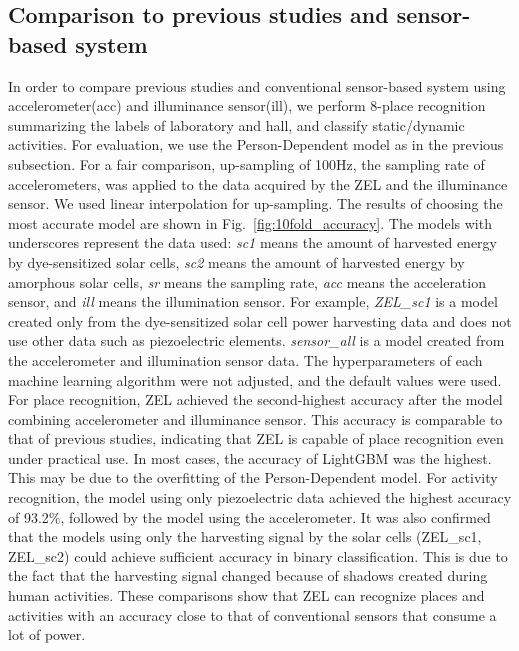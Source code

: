 \documentclass[conference]{IEEEtran}
\begin{document}
\subsection{Comparison to previous studies and sensor-based system}
In order to compare previous studies and conventional sensor-based system using accelerometer(acc) and illuminance sensor(ill), we perform 8-place recognition summarizing the labels of laboratory and hall, and classify static/dynamic activities.
For evaluation, we use the Person-Dependent model as in the previous subsection.
For a fair comparison, up-sampling of 100Hz, the sampling rate of accelerometers, was applied to the data acquired by the ZEL and the illuminance sensor.
We used linear interpolation for up-sampling.
The results of choosing the most accurate model are shown in Fig.~\ref{fig:10fold_accuracy}.
The models with underscores represent the data used: \textit{sc1} means the amount of harvested energy by dye-sensitized solar cells, \textit{sc2} means the amount of harvested energy by amorphous solar cells, \textit{sr} means the sampling rate, \textit{acc} means the acceleration sensor, and \textit{ill} means the illumination sensor.
For example, \textit{ZEL\_sc1} is a model created only from the dye-sensitized solar cell power harvesting data and does not use other data such as piezoelectric elements.
\textit{sensor\_all} is a model created from the accelerometer and illumination sensor data.
The hyperparameters of each machine learning algorithm were not adjusted, and the default values were used.
For place recognition, ZEL achieved the second-highest accuracy after the model combining accelerometer and illuminance sensor.
This accuracy is comparable to that of previous studies\cite{umetsu2019ehaas,sugata2019battery}, indicating that ZEL is capable of place recognition even under practical use.
In most cases, the accuracy of LightGBM was the highest. This may be due to the overfitting of the Person-Dependent model.
For activity recognition, the model using only piezoelectric data achieved the highest accuracy of 93.2\%, followed by the model using the accelerometer.
It was also confirmed that the models using only the harvesting signal by the solar cells (ZEL\_sc1, ZEL\_sc2) could achieve sufficient accuracy in binary classification.
This is due to the fact that the harvesting signal changed because of shadows created during human activities.
These comparisons show that ZEL can recognize places and activities with an accuracy close to that of conventional sensors that consume a lot of power.
\end{document}
